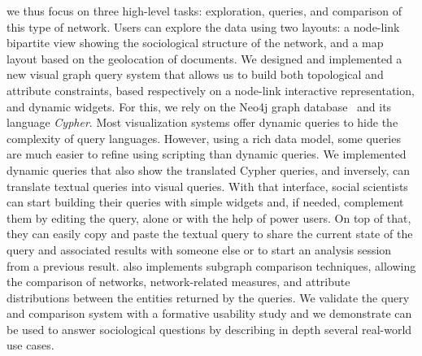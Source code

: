 we thus focus on three high-level tasks: exploration, queries, and comparison of this type of network.
Users can explore the data using two layouts: a node-link bipartite view showing the sociological structure of the network, and a map layout based on the geolocation of documents.
We designed and implemented a new visual graph query system that allows us to build both topological and attribute constraints, based respectively on a node-link interactive representation, and dynamic widgets. For this, we rely on the Neo4j graph database~\cite{neo4j} and its language \emph{Cypher}. Most visualization systems offer dynamic queries to hide the complexity of query languages. However, using a rich data model, some queries are much easier to refine using scripting than dynamic queries. We implemented dynamic queries that also show the translated Cypher queries, and inversely, can translate textual queries into visual queries.
With that interface, social scientists can start building their queries with simple widgets and, if needed, complement them by editing the query, alone or with the help of power users. On top of that, they can easily copy and paste the textual query to share the current state of the query and associated results with someone else or to start an analysis session from a previous result.
\name also implements subgraph comparison techniques, allowing the comparison of networks, network-related measures, and attribute distributions between the entities returned by the queries.
We validate the query and comparison system with a formative usability study and we demonstrate \name can be used to answer sociological questions by describing in depth several real-world use cases.


